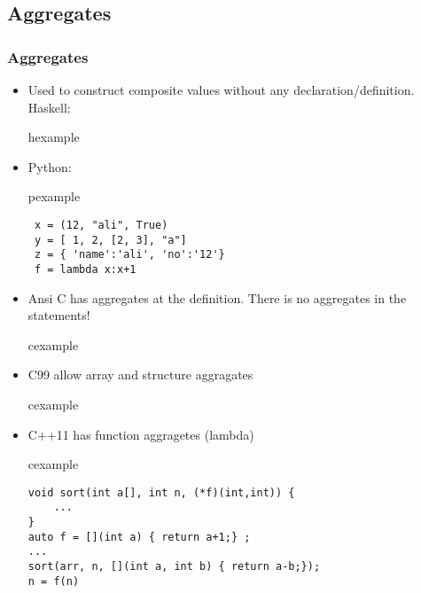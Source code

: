 \subsection{Aggregates}
\begin{frame}[fragile]
\frametitle{Aggregates}
\begin{itemize}
 \item Used to construct composite values without any declaration/definition.
 Haskell:
\begin{beamercolorbox}{hexample}
 \codeaggH
\end{beamercolorbox}
 \item Python:\\
\begin{beamercolorbox}{pexample}
\begin{lstlisting}
 x = (12, "ali", True)
 y = [ 1, 2, [2, 3], "a"]
 z = { 'name':'ali', 'no':'12'}
 f = lambda x:x+1
\end{lstlisting}
\end{beamercolorbox}
\end{itemize}
\end{frame}

\begin{frame}[fragile]
\begin{itemize}
\item Ansi C has aggregates  at the
definition. There is no aggregates in the statements!
\begin{beamercolorbox}{cexample}
 \codeaggC
\end{beamercolorbox}
\item C99  allow array and structure aggragates
\begin{beamercolorbox}{cexample}
 \codeaggCnn
\end{beamercolorbox}
\item C++11 has function aggragetes (lambda)\\
\begin{beamercolorbox}{cexample}
\begin{lstlisting}
void sort(int a[], int n, (*f)(int,int)) {
	...
}
auto f = [](int a) { return a+1;} ;
...
sort(arr, n, [](int a, int b) { return a-b;});
n = f(n)
\end{lstlisting}
\end{beamercolorbox}
\end{itemize}
\end{frame}

